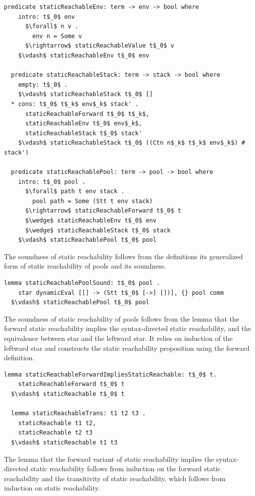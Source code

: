 \documentclass[letterpaper, 11pt]{extarticle}
\begin{document}
\begin{lstlisting}[language=logic, mathescape]
  predicate staticReachableEnv: term -> env -> bool where
    intro: t$_0$ env
      $\forall$ n v . 
        env n = Some v
      $\rightarrow$ staticReachableValue t$_0$ v
    $\vdash$ staticReachableEnv t$_0$ env

  predicate staticReachableStack: term -> stack -> bool where
    empty: t$_0$ .
    $\vdash$ staticReachableStack t$_0$ []
  * cons: t$_0$ t$_k$ env$_k$ stack' .
      staticReachableForward t$_0$ t$_k$, 
      staticReachableEnv t$_0$ env$_k$,
      staticReachableStack t$_0$ stack' 
    $\vdash$ staticReachableStack t$_0$ ((Ctn n$_k$ t$_k$ env$_k$) # stack')

  predicate staticReachablePool: term -> pool -> bool where
    intro: t$_0$ pool .
      $\forall$ path t env stack .
        pool path = Some (Stt t env stack) 
      $\rightarrow$ staticReachableForward t$_0$ t
      $\wedge$ staticReachableEnv t$_0$ env
      $\wedge$ staticReachableStack t$_0$ stack
    $\vdash$ staticReachablePool t$_0$ pool

\end{lstlisting}

The soundness of static reachability follows from the definitions
its generalized form of static reachability of pools and its soundness.

\begin{lstlisting}[language=logic, mathescape]
  lemma staticReachablePoolSound: t$_0$ pool .
    star dynamicEval [[] -> (Stt t$_0$ [->] [])], {} pool comm 
  $\vdash$ staticReachablePool t$_0$ pool
\end{lstlisting}

The soundness of static reachability of pools follows from the lemma that the forward
static reachability implies the syntax-directed static reachability,
and the equivalence between star and the leftward star. It relies on induction of the
leftward star and constructs the static reachability proposition using the forward definition. 

\begin{lstlisting}[language=logic, mathescape]
  lemma staticReachableForwardImpliesStaticReachable: t$_0$ t. 
    staticReachableForward t$_0$ t
  $\vdash$ staticReachable t$_0$ t

  lemma staticReachableTrans: t1 t2 t3 .
    staticReachable t1 t2,
    staticReachable t2 t3
  $\vdash$ staticReachable t1 t3
\end{lstlisting}

The lemma that the forward variant of static reachability implies the syntax-directed static
reachability follows from induction on the forward static reachability and the
transitivity of static reachability, which follows from induction on static reachability.
\end{document}
